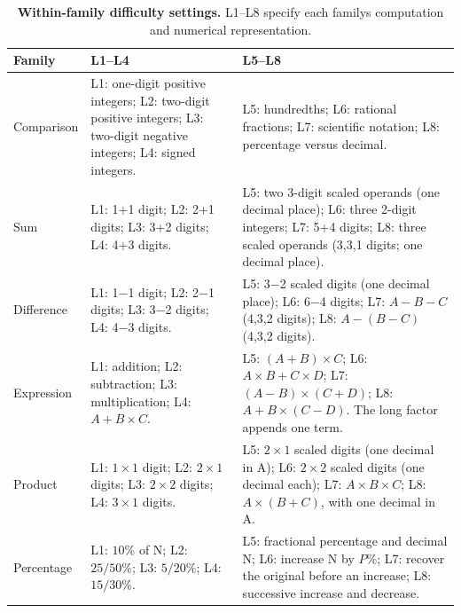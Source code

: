 \begin{table}[H]
\caption{\textbf{Within-family difficulty settings.} L1--L8 specify each family\textquotesingle s computation and numerical representation.}
\label{tab:difficulty-definitions}
\centering\tablefont
\setlength{\tabcolsep}{3pt}
\begin{tabular}{@{}p{.10\linewidth}p{.40\linewidth}p{.43\linewidth}@{}}
\toprule
\textbf{Family} & \textbf{L1--L4} & \textbf{L5--L8} \\
\midrule
Comparison & L1: one-digit positive integers; L2: two-digit positive integers; L3: two-digit negative integers; L4: signed integers. & L5: hundredths; L6: rational fractions; L7: scientific notation; L8: percentage versus decimal. \\
\addlinespace[3pt]
Sum & L1: 1+1 digit; L2: 2+1 digits; L3: 3+2 digits; L4: 4+3 digits. & L5: two 3-digit scaled operands (one decimal place); L6: three 2-digit integers; L7: 5+4 digits; L8: three scaled operands (3,3,1 digits; one decimal place). \\
\addlinespace[3pt]
Difference & L1: 1$-$1 digit; L2: 2$-$1 digits; L3: 3$-$2 digits; L4: 4$-$3 digits. & L5: 3$-$2 scaled digits (one decimal place); L6: 6$-$4 digits; L7: $A-B-C$ (4,3,2 digits); L8: $A-(B-C)$ (4,3,2 digits). \\
\addlinespace[3pt]
Expression & L1: addition; L2: subtraction; L3: multiplication; L4: $A+B\times C$. & L5: $(A+B)\times C$; L6: $A\times B+C\times D$; L7: $(A-B)\times(C+D)$; L8: $A+B\times(C-D)$. The long factor appends one term. \\
\addlinespace[3pt]
Product & L1: $1\times1$ digit; L2: $2\times1$ digits; L3: $2\times2$ digits; L4: $3\times1$ digits. & L5: $2\times1$ scaled digits (one decimal in A); L6: $2\times2$ scaled digits (one decimal each); L7: $A\times B\times C$; L8: $A\times(B+C)$, with one decimal in A. \\
\addlinespace[3pt]
Percentage & L1: $10\%$ of N; L2: $25/50\%$; L3: $5/20\%$; L4: $15/30\%$. & L5: fractional percentage and decimal N; L6: increase N by $P\%$; L7: recover the original before an increase; L8: successive increase and decrease. \\
\bottomrule
\end{tabular}
\end{table}
